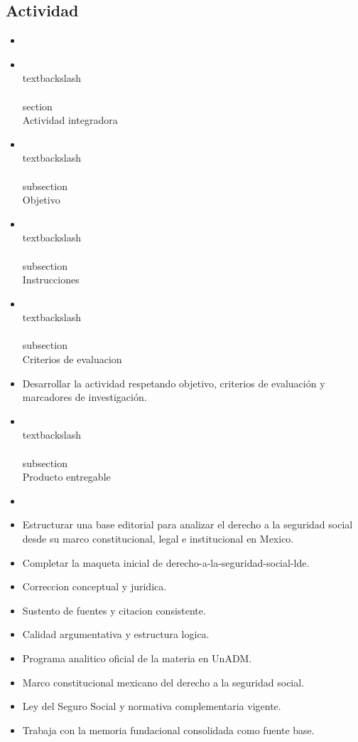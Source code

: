 \documentclass[12pt]{article}
\begin{document}
\subsection*{Actividad}
\begin{itemize}[leftmargin=*]
  \item \\%
  \item \\textbackslash\\{\\}section\\{Actividad integradora\\}
  \item \\textbackslash\\{\\}subsection\\{Objetivo\\}
  \item \\textbackslash\\{\\}subsection\\{Instrucciones\\}
  \item \\textbackslash\\{\\}subsection\\{Criterios de evaluacion\\}
  \item Desarrollar la actividad respetando objetivo, criterios de evaluación y marcadores de investigación.
  \item \\textbackslash\\{\\}subsection\\{Producto entregable\\}
  \item \\%
  \item Estructurar una base editorial para analizar el derecho a la seguridad social desde su marco constitucional, legal e institucional en Mexico.
  \item Completar la maqueta inicial de derecho-a-la-seguridad-social-lde.
  \item Correccion conceptual y juridica.
  \item Sustento de fuentes y citacion consistente.
  \item Calidad argumentativa y estructura logica.
  \item Programa analitico oficial de la materia en UnADM.
  \item Marco constitucional mexicano del derecho a la seguridad social.
  \item Ley del Seguro Social y normativa complementaria vigente.
  \item Trabaja con la memoria fundacional consolidada como fuente base.
\end{itemize}
\end{document}
